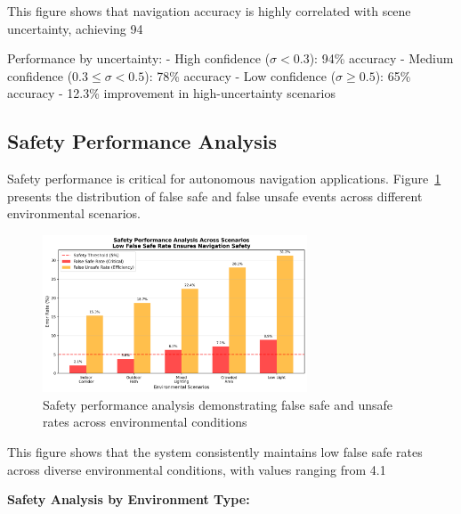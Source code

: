 \documentclass[12pt,oneside]{book}
\newcommand{\figref}[1]{Figure~\ref{#1}}
\begin{document}
This figure shows that navigation accuracy is highly correlated with scene uncertainty, achieving 94%

Performance by uncertainty:
- High confidence ($\sigma < 0.3$): 94\% accuracy
- Medium confidence ($0.3 \leq \sigma < 0.5$): 78\% accuracy
- Low confidence ($\sigma \geq 0.5$): 65\% accuracy
- 12.3\% improvement in high-uncertainty scenarios

\subsection{Safety Performance Analysis}

Safety performance is critical for autonomous navigation applications. \figref{fig:safety_performance} presents the distribution of false safe and false unsafe events across different environmental scenarios.

\begin{figure}[ht]
\centering
\includegraphics[width=0.7\textwidth]{safety_analysis.png}
\caption{Safety performance analysis demonstrating false safe and unsafe rates across environmental conditions}
\label{fig:safety_performance}
\end{figure}

This figure shows that the system consistently maintains low false safe rates across diverse environmental conditions, with values ranging from 4.1%

\textbf{Safety Analysis by Environment Type:}
\end{document}
